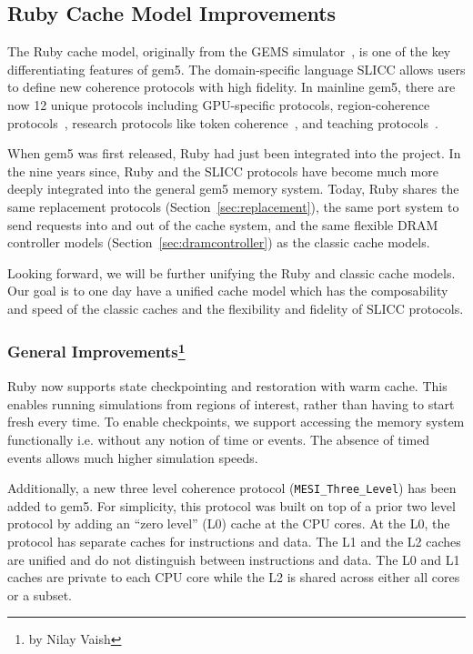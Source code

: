 \subsection[Ruby Cache Model Improvements]{Ruby Cache Model Improvements}
\label{sec:ruby}

The Ruby cache model, originally from the GEMS simulator~\cite{MartinSBMXAMHW05}, is one of the key differentiating features of gem5.
The domain-specific language SLICC allows users to define new coherence protocols with high fidelity.
In mainline gem5, there are now 12 unique protocols including GPU-specific protocols, region-coherence protocols~\cite{PowerBasu2013-hsc}, research protocols like token coherence~\cite{MartinHill2003-tokenCoh}, and teaching protocols~\cite{NagarajanSorin2020-cohMCMPrimer}.

When gem5 was first released, Ruby had just been integrated into the project.
In the nine years since, Ruby and the SLICC protocols have become much more deeply integrated into the general gem5 memory system.
Today, Ruby shares the same replacement protocols (Section~\ref{sec:replacement}), the same port system to send requests into and out of the cache system, and the same flexible DRAM controller models (Section~\ref{sec:dramcontroller}) as the classic cache models.

Looking forward, we will be further unifying the Ruby and classic cache models.
Our goal is to one day have a unified cache model which has the composability and speed of the classic caches and the flexibility and fidelity of SLICC protocols.

\subsubsection[General Improvements]{General Improvements\footnote{by Nilay Vaish}}

Ruby now supports state checkpointing and restoration with warm cache.
This enables running simulations from regions of interest, rather than having to start fresh every time.
To enable checkpoints, we support accessing the memory system functionally i.e. without any notion of time or events.
The absence of timed events allows much higher simulation speeds.

Additionally, a new three level coherence protocol (\verb|MESI_Three_Level|) has been added to gem5.
For simplicity, this protocol was built on top of a prior two level protocol by adding an ``zero level'' (L0) cache at the CPU cores.
At the L0, the protocol has separate caches for instructions and data.
The L1 and the L2 caches are unified and do not distinguish between instructions and data.
The L0 and L1 caches are private to each CPU core while the L2 is shared across either all cores or a subset.

